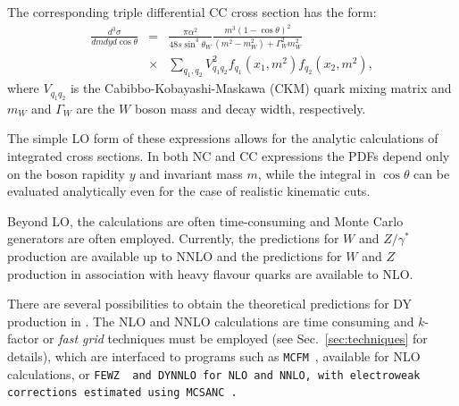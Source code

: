 \\
\\
The corresponding triple differential CC cross section has the form:
\begin{eqnarray}
\frac{d^3\sigma}{dmdyd\cos\theta} &=&
 \frac{\pi\alpha^2}{48s\sin^4\theta_W}
 \frac{m^3(1-\cos\theta)^2}{(m^2-m_W^2)+\Gamma_W^2m_W^2}  \nonumber \\
 &\times& \sum_{q_1,q_2}V_{q_1q_2}^2f_{q_1}(x_1,m^2)f_{q_2}(x_2,m^2),
\end{eqnarray}
where \(V_{q_1q_2}\) is the Cabibbo-Kobayashi-Maskawa (CKM) quark mixing matrix and \(m_W\) and \(\Gamma_W\)
are the \(W\) boson mass and decay width, respectively.

The simple LO form of these expressions allows for the analytic calculations of integrated
cross sections.
In both NC and CC expressions the PDFs depend only on the boson rapidity \(y\) and
invariant mass \(m\), while
the integral in \(\cos\theta\) can be evaluated analytically
even for the case of realistic kinematic cuts.
%

Beyond LO, the calculations are often time-consuming and Monte Carlo generators are often employed. 
Currently, the predictions for $W$ and $Z/\gamma^*$ production are available up
to NNLO and the predictions for $W$ and $Z$ production in association with heavy flavour quarks are available to NLO.

There are several possibilities to obtain the theoretical
predictions for DY production in \fitter. 
The NLO and NNLO calculations are time consuming
and $k$-factor or \emph{fast grid} techniques must be employed (see Sec.~\ref{sec:techniques}
for details), which are interfaced to programs such as
\texttt{MCFM}~\cite{Campbell:1999ah,Campbell:2000je,Campbell:2010ff}, 
available for NLO calculations, or 
\tt FEWZ\rm~\cite{FEWZ} and \tt DYNNLO\rm \cite{DYNNLO} for NLO and NNLO, with electroweak corrections estimated using \tt MCSANC\rm~\cite{Bardin:2012jk, Bondarenko:2013nu}.
 

